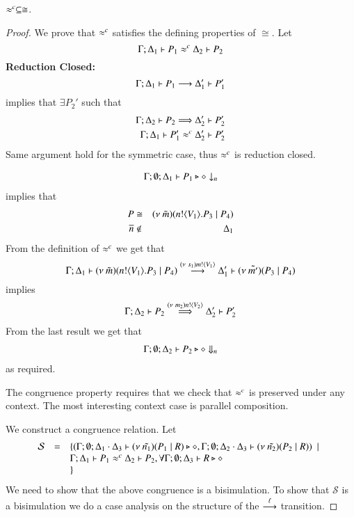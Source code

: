 \begin{lemma}
	\label{lem:wbc_is_cong}
	$\approx^{c} \subseteq \cong$.
\end{lemma}


\begin{proof}
	\noi We prove that $\approx^{c}$ satisfies the defining properties of $\cong$. Let
%
	\[
		\Gamma; \Delta_1 \vdash P_1 \approx^{c} \Delta_2 \vdash P_2
	\]
%
	{\bf Reduction Closed:}
%
	\[
		\Gamma; \Delta_1 \vdash P_1 \stackrel{}{\longrightarrow} \Delta_1' \vdash P_1'
	\]
%
	\noi implies that 
	$\exists P_2'$ such that 
%
	\begin{eqnarray*}
		\Gamma; \Delta_2 \vdash P_2 \stackrel{}{\Longrightarrow} \Delta_2' \vdash P_2'\\
		\Gamma; \Delta_1 \vdash P_1' \approx^{c} \Delta_2' \vdash P_2'
	\end{eqnarray*}
%
	\noi Same argument hold for the symmetric case, thus $\approx^{c}$ is reduction closed.

%
	\begin{eqnarray*}
		\Gamma; \emptyset; \Delta_1 \vdash P_1 \triangleright \diamond \downarrow_{n}
	\end{eqnarray*}
%
	implies that
	\begin{eqnarray*}
		P &\cong& (\nu\ \tilde{m})(n ! \langle V_1 \rangle . P_3 \;|\; P_4)\\
		\overline{n} &\notin& \Delta_1
	\end{eqnarray*}
%
	\noi From the definition of $\approx^{c}$ we get that
%
\[
	\Gamma; \Delta_1 \vdash (\nu\ \tilde{m})(n ! \langle V_1 \rangle . P_3 \;|\; P_4) \stackrel{(\nu\ s_1) m ! \langle V_1 \rangle}{\longrightarrow} \Delta_1' \vdash (\nu\ \tilde{m'})(P_3 \;|\; P_4)
\]
%
	\noi implies
%
	\begin{eqnarray*}
		\Gamma; \Delta_2 \vdash P_2 \stackrel{(\nu\ m_2) n ! \langle V_2 \rangle}{\Longrightarrow} \Delta_2' \vdash P_2'\\
	\end{eqnarray*}
%
	\noi From the last result we get that
%
	\begin{eqnarray*}
		\Gamma; \emptyset; \Delta_2 \vdash P_2 \triangleright \diamond \Downarrow_{n}
	\end{eqnarray*}
%
	\noi as required.


	\noi The congruence property requires that we check that $\approx^{c}$
	is preserved under any context.
	The most interesting context case is parallel composition.

	\noi We construct a congruence relation. Let
	\[
	\begin{array}{rcl}
		\mathcal{S} &=&	\{
				(\Gamma; \emptyset; \Delta_1 \cdot \Delta_3 \vdash (\nu\ \tilde{n_1})(P_1 \;|\; R) \triangleright \diamond,
				\Gamma; \emptyset; \Delta_2 \cdot \Delta_3 \vdash (\nu\ \tilde{n_2})(P_2 \;|\; R))
				\ \ |\ \  \\
		& &		\Gamma; \Delta_1 \vdash P_1 \approx^{c} \Delta_2 \vdash P_2, \forall \Gamma; \emptyset; \Delta_3 \vdash R \triangleright \diamond\\
		& &\}
	\end{array}
	\]
	\noi We need to show that the above congruence is a bisimulation.
	To show that $\mathcal{S}$ is a bisimulation we do a case analysis on the structure
	of the $\stackrel{\ell}{\longrightarrow}$ transition.


\end{proof}
